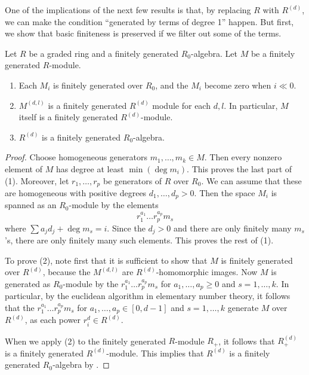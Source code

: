 One of the implications of the next few results is that, by replacing $R$ with
$R^{(d)}$, we can make the condition ``generated by terms of degree 1'' happen.
But first, we show that basic finiteness is preserved if we filter out some of
the terms.

\begin{proposition} \label{duple preserves finiteness}
Let $R$ be a graded ring and a finitely generated $R_0$-algebra. Let $M$ be a
finitely generated $R$-module.
\begin{enumerate}
\item Each $M_i$ is finitely generated over $R_0$, and the $M_i$ become zero
when $i \ll
0$.
\item  $M^{(d,l)}$ is a finitely generated $R^{(d)}$ module for each $d,l$. In
particular, $M$ itself is a finitely generated $R^{(d)}$-module.
\item $R^{(d)}$ is a finitely generated $R_0$-algebra.
\end{enumerate}
\end{proposition} 
\begin{proof} 
Choose homogeneous generators $m_1, \dots, m_k \in M$. Then every nonzero
element of $M$ has degree at least $\min(\deg m_i)$.  This proves the
last part of (1). Moreover, let $r_1, \dots, r_p$ be generators of $R$ over
$R_0$.
We can assume that these are homogeneous with positive degrees $d_1, \dots,
d_p>0$.
Then the space $M_i$ is spanned as an $R_0$-module by the elements
\[  r_1^{a_1} \dots r_p^{a_p} m_s  \]
where $\sum a_j d_j + \deg m_s = i$.  Since the $d_j>0$ and there are only
finitely many $m_s$'s, there are only finitely many such elements. This proves
the rest of (1).

To prove (2), note first that it is sufficient to show that $M$ is finitely
generated over $R^{(d)}$, because the $M^{(d,l)}$ are $R^{(d)}$-homomorphic
images.
Now $M$ is generated as $R_0$-module by the $r_1^{a_1} \dots r_p^{a_p} m_s $
for $a_1, \dots, a_p \geq 0$ and $s = 1, \dots,  k$.
In particular, by the euclidean algorithm in elementary number theory, it
follows that the 
$r_1^{a_1} \dots r_p^{a_p} m_s $
for $a_1, \dots, a_p \in [0, d-1]$ and $s = 1, \dots,  k$ generate $M$ over
$R^{(d)}$, as each power $r_i^{d} \in R^{(d)}$.

When we apply (2) to the finitely generated $R$-module $R_+$, it follows that
$R^{(d)}_+$ is a finitely generated
$R^{(d)}$-module. This implies that $R^{(d)}$ is a finitely generated
$R_0$-algebra by \rref{}.
\end{proof}

